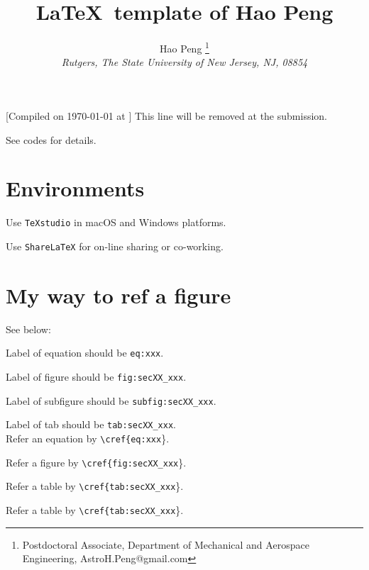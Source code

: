\documentclass[]{article}
\title{\LaTeX\ template of Hao Peng}
\author{Hao Peng%
	\thanks{Postdoctoral Associate, Department of Mechanical and Aerospace Engineering, AstroH.Peng@gmail.com}\\
	{\normalsize\itshape
		Rutgers, The State University of New Jersey, NJ, 08854}}
\date{}
\begin{document}
\maketitle

{\footnotesize  [Compiled on \today{} at \currenttime] This line will be removed at the submission.}

See codes for details.


\section{Environments}

Use \texttt{TeXstudio} in macOS and Windows platforms. 

Use \texttt{ShareLaTeX} for on-line sharing or co-working. 





\section{My way to ref a figure}

See below:

Label of equation should be \texttt{eq:xxx}. 

Label of figure should be \texttt{fig:secXX\_xxx}. 

Label of subfigure should be \texttt{subfig:secXX\_xxx}. 

Label of tab should be \texttt{tab:secXX\_xxx}. \\

Refer an equation by \texttt{\textbackslash cref\{eq:xxx}\}. 

Refer a figure by \texttt{\textbackslash cref\{fig:secXX\_xxx}\}. 

Refer a table by \texttt{\textbackslash cref\{tab:secXX\_xxx}\}. 

Refer a table by \texttt{\textbackslash cref\{tab:secXX\_xxx}\}. 
\end{document}
